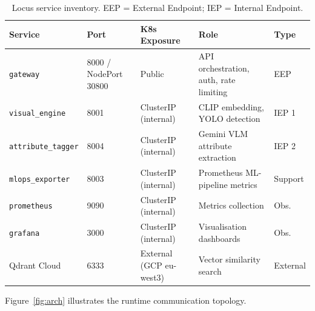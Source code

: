 \documentclass[12pt]{article}
\begin{document}
\begin{table}[H]
\centering
\small
\begin{tabular}{@{}lllll@{}}
\toprule
\textbf{Service} & \textbf{Port} & \textbf{K8s Exposure} & \textbf{Role} & \textbf{Type} \\ \midrule
\texttt{gateway}          & 8000 / NodePort 30800 & Public       & API orchestration, auth, rate limiting & EEP \\
\texttt{visual\_engine}   & 8001 & ClusterIP (internal) & CLIP embedding, YOLO detection         & IEP 1 \\
\texttt{attribute\_tagger}& 8004 & ClusterIP (internal) & Gemini VLM attribute extraction        & IEP 2 \\
\texttt{mlops\_exporter}  & 8003 & ClusterIP (internal) & Prometheus ML-pipeline metrics         & Support \\
\texttt{prometheus}       & 9090 & ClusterIP (internal) & Metrics collection                     & Obs. \\
\texttt{grafana}          & 3000 & ClusterIP (internal) & Visualisation dashboards               & Obs. \\
Qdrant Cloud              & 6333 & External (GCP eu-west3) & Vector similarity search            & External \\ \bottomrule
\end{tabular}
\caption{Locus service inventory. EEP = External Endpoint; IEP = Internal Endpoint.}
\label{tab:services}
\end{table}

\noindent Figure~\ref{fig:arch} illustrates the runtime communication topology.

\vspace{1em}
\end{document}
